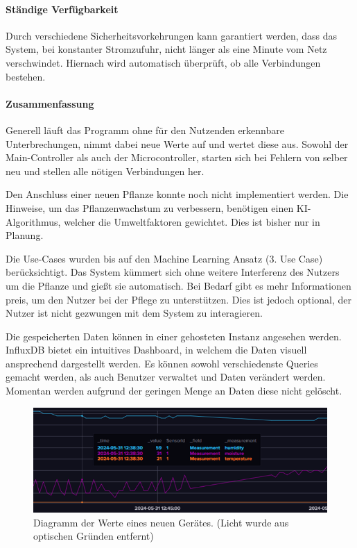 \paragraph{Ständige Verfügbarkeit}
Durch verschiedene Sicherheitsvorkehrungen kann garantiert werden, dass das System, bei konstanter Stromzufuhr, nicht länger als eine Minute vom Netz verschwindet. Hiernach wird automatisch überprüft, ob alle Verbindungen bestehen.

\paragraph{Zusammenfassung}
Generell läuft das Programm ohne für den Nutzenden erkennbare Unterbrechungen, nimmt dabei neue Werte auf und wertet diese aus. Sowohl der Main-Controller als auch der Microcontroller, starten sich bei Fehlern von selber neu und stellen alle nötigen Verbindungen her.

Den Anschluss einer neuen Pflanze konnte noch nicht implementiert werden. Die Hinweise, um das Pflanzenwachstum zu verbessern, benötigen einen KI-Algorithmus, welcher die Umweltfaktoren gewichtet. Dies ist bisher nur in Planung.

Die Use-Cases wurden bis auf den Machine Learning Ansatz (3. Use Case) berücksichtigt. Das System kümmert sich ohne weitere Interferenz des Nutzers um die Pflanze und gießt sie automatisch. Bei Bedarf gibt es mehr Informationen preis, um den Nutzer bei der Pflege zu unterstützen. Dies ist jedoch optional, der Nutzer ist nicht gezwungen mit dem System zu interagieren.

Die gespeicherten Daten können in einer gehosteten Instanz angesehen werden. InfluxDB bietet ein intuitives Dashboard, in welchem die Daten visuell ansprechend dargestellt werden. Es können sowohl verschiedenste Queries gemacht werden, als auch Benutzer verwaltet und Daten verändert werden. Momentan werden aufgrund der geringen Menge an Daten diese nicht gelöscht.

\begin{figure}[H]
\centering
\includegraphics[width=\textwidth]{images/Graph.png}
\caption{Diagramm der Werte eines neuen Gerätes. (Licht wurde aus optischen Gründen entfernt) \cite{lameres1998fuzzy}}
\label{fig:Fuzzy Voltage Controller}
\end{figure}

